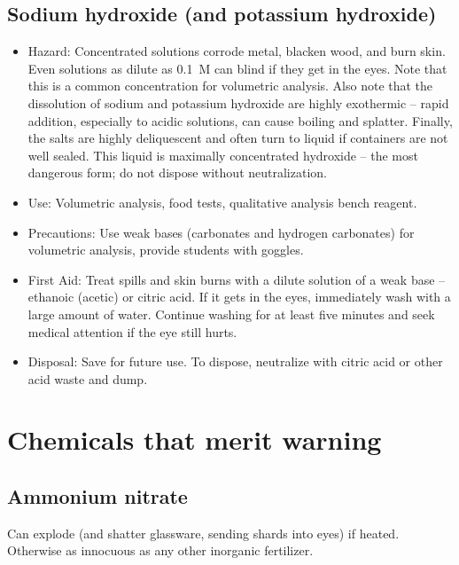 \subsection{Sodium hydroxide (and potassium hydroxide)}

\begin{itemize}

\item{Hazard: Concentrated solutions corrode metal, 
blacken wood, and burn skin. 
Even solutions as dilute as 0.1~M can blind if they get in the eyes. 
Note that this is a common concentration for volumetric analysis. 
Also note that the dissolution of sodium and potassium hydroxide 
are highly exothermic -- rapid addition, especially to acidic solutions, 
can cause boiling and splatter. 
Finally, the salts are highly deliquescent 
and often turn to liquid if containers are not well sealed. 
This liquid is maximally concentrated hydroxide -- 
the most dangerous form; do not dispose without neutralization.}

\item{Use: Volumetric analysis, food tests, 
qualitative analysis bench reagent.}

\item{Precautions: Use weak bases (carbonates and hydrogen carbonates) 
for volumetric analysis, provide students with goggles.}

\item{First Aid: Treat spills and skin burns 
with a dilute solution of a weak base -- ethanoic (acetic) or citric acid. 
If it gets in the eyes, immediately wash with a large amount of water. 
Continue washing for at least five minutes 
and seek medical attention if the eye still hurts.}

\item{Disposal: Save for future use. 
To dispose, neutralize with citric acid or other acid waste and dump.}

\end{itemize}

\section{Chemicals that merit warning}

\subsection{Ammonium nitrate}
Can explode (and shatter glassware, sending shards into eyes) if heated. 
Otherwise as innocuous as any other inorganic fertilizer.

